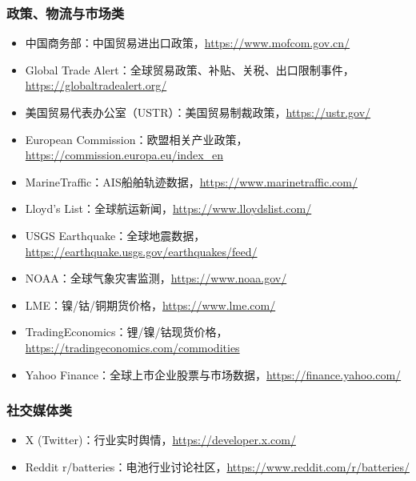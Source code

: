 ﻿\documentclass[12pt,a4paper]{article}
\begin{document}
\subsubsection{政策、物流与市场类}
\begin{itemize}
    \item 中国商务部：中国贸易进出口政策，\url{https://www.mofcom.gov.cn/}
    \item Global Trade Alert：全球贸易政策、补贴、关税、出口限制事件，\url{https://globaltradealert.org/}
    \item 美国贸易代表办公室（USTR）：美国贸易制裁政策，\url{https://ustr.gov/}
    \item European Commission：欧盟相关产业政策，\url{https://commission.europa.eu/index_en}
    \item MarineTraffic：AIS船舶轨迹数据，\url{https://www.marinetraffic.com/}
    \item Lloyd’s List：全球航运新闻，\url{https://www.lloydslist.com/}
    \item USGS Earthquake：全球地震数据，\url{https://earthquake.usgs.gov/earthquakes/feed/}
    \item NOAA：全球气象灾害监测，\url{https://www.noaa.gov/}
    \item LME：镍/钴/铜期货价格，\url{https://www.lme.com/}
    \item TradingEconomics：锂/镍/钴现货价格，\url{https://tradingeconomics.com/commodities}
    \item Yahoo Finance：全球上市企业股票与市场数据，\url{https://finance.yahoo.com/}
\end{itemize}

\subsubsection{社交媒体类}
\begin{itemize}
    \item X (Twitter)：行业实时舆情，\url{https://developer.x.com/}
    \item Reddit r/batteries：电池行业讨论社区，\url{https://www.reddit.com/r/batteries/}
\end{itemize}
\end{document}

